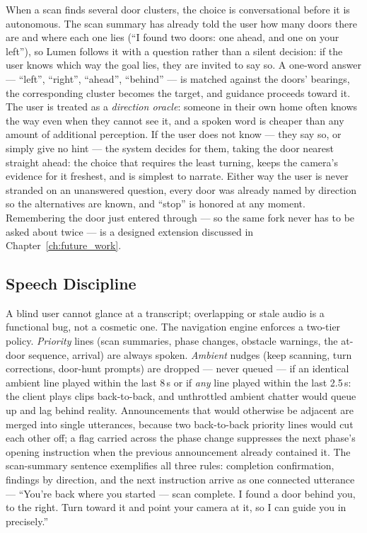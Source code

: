 When a scan finds several door clusters, the choice is conversational before it is
autonomous. The scan summary has already told the user how many doors there are and
where each one lies (``I found two doors: one ahead, and one on your left''), so
Lumen follows it with a question rather than a silent decision: if the user knows
which way the goal lies, they are invited to say so. A one-word answer ---
``left'', ``right'', ``ahead'', ``behind'' --- is matched against the doors'
bearings, the corresponding cluster becomes the target, and guidance proceeds
toward it. The user is treated as a \emph{direction oracle}: someone in their own
home often knows the way even when they cannot see it, and a spoken word is cheaper
than any amount of additional perception. If the user does not know --- they say so,
or simply give no hint --- the system decides for them, taking the door nearest
straight ahead: the choice that requires the least turning, keeps the camera's
evidence for it freshest, and is simplest to narrate. Either way the user is never
stranded on an unanswered question, every door was already named by direction so
the alternatives are known, and ``stop'' is honored at any moment. Remembering the
door just entered through --- so the same fork never has to be asked about twice ---
is a designed extension discussed in Chapter~\ref{ch:future_work}.

\subsection{Speech Discipline}
\label{sec:speech_discipline}

A blind user cannot glance at a transcript; overlapping or stale audio is a
functional bug, not a cosmetic one. The navigation engine enforces a two-tier
policy. \emph{Priority} lines (scan summaries, phase changes, obstacle warnings,
the at-door sequence, arrival) are always spoken. \emph{Ambient} nudges (keep
scanning, turn corrections, door-hunt prompts) are dropped --- never queued --- if
an identical ambient line played within the last 8\,s or if \emph{any} line played
within the last 2.5\,s: the client plays clips back-to-back, and unthrottled
ambient chatter would queue up and lag behind reality. Announcements that would
otherwise be adjacent are merged into single utterances, because two back-to-back
priority lines would cut each other off; a flag carried across the phase change
suppresses the next phase's opening instruction when the previous announcement
already contained it. The scan-summary sentence exemplifies all three rules:
completion confirmation, findings by direction, and the next instruction arrive as
one connected utterance --- ``You're back where you started --- scan complete. I
found a door behind you, to the right. Turn toward it and point your camera at it,
so I can guide you in precisely.''